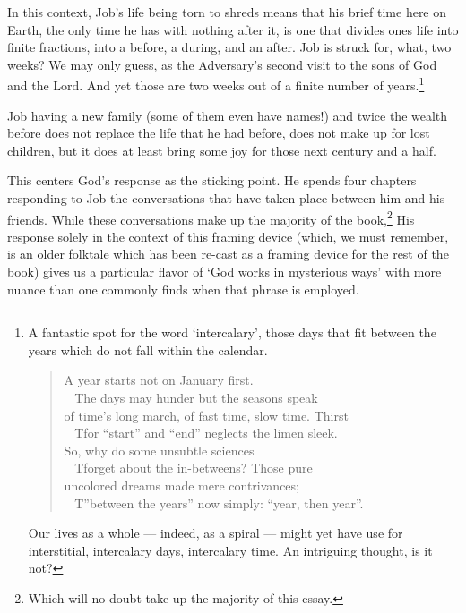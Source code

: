 In this context, Job's life being torn to shreds means that his brief time here on Earth, the only time he has with nothing after it, is one that divides ones life into finite fractions, into a before, a during, and an after. Job is struck for, what, two weeks? We may only guess, as the Adversary's second visit to the sons of God and the Lord. And yet those are two weeks out of a finite number of years.\footnote{A fantastic spot for the word `intercalary', those days that fit between the years which do not fall within the calendar.

  \begin{quote}
  A year starts not on January first.\\
  \hspace*{0.333em} ~ The days may hunder but the seasons speak\\
  of time's long march, of fast time, slow time. Thirst\\
  \hspace*{0.333em} ~ Tfor ``start'' and ``end'' neglects the limen sleek.\\
  So, why do some unsubtle sciences\\
  \hspace*{0.333em} ~ Tforget about the in-betweens? Those pure\\
  uncolored dreams made mere contrivances;\\
  \hspace*{0.333em} ~ T''between the years'' now simply: ``year, then year''.

  \parencite[3]{eigengrau}
  \end{quote}

  Our lives as a whole --- indeed, as a spiral --- might yet have use for interstitial, intercalary days, intercalary time. An intriguing thought, is it not?}

Job having a new family (some of them even have names!) and twice the wealth before does not replace the life that he had before, does not make up for lost children, but it does at least bring some joy for those next century and a half.

This centers God's response as the sticking point. He spends four chapters responding to Job the conversations that have taken place between him and his friends. While these conversations make up the majority of the book,\footnote{Which will no doubt take up the majority of this essay.} His response solely in the context of this framing device (which, we must remember, is an older folktale which has been re-cast as a framing device for the rest of the book) gives us a particular flavor of `God works in mysterious ways' with more nuance than one commonly finds when that phrase is employed.

